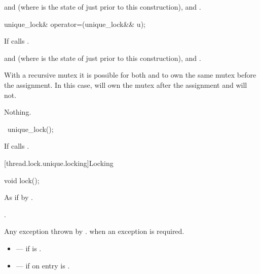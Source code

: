 \begin{itemdescr}
\pnum
\ensures
{} and  (where  is the state of  just prior to this construction),   and .
\end{itemdescr}

%
\begin{itemdecl}
unique_lock& operator=(unique_lock&& u);
\end{itemdecl}

\begin{itemdescr}
\pnum
\effects
If  calls .

\pnum
\ensures
{} and  (where  is the state of  just prior to this construction),   and .

\pnum
\begin{note}
With a recursive mutex it is possible for both  and  to own the same mutex before the assignment. In this case,  will own the mutex after the assignment and  will not.
\end{note}

\pnum
\throws
Nothing.
\end{itemdescr}

%
\begin{itemdecl}
~unique_lock();
\end{itemdecl}

\begin{itemdescr}
\pnum
\effects
If  calls .
\end{itemdescr}

[thread.lock.unique.locking]{Locking}

%
\begin{itemdecl}
void lock();
\end{itemdecl}

\begin{itemdescr}
\pnum
\effects
As if by .

\pnum
\ensures
{}.

\pnum
\throws
Any exception thrown by .  when an exception
is required.

\pnum
\errors
\begin{itemize}
\item {} --- if  is .
\item {} --- if on entry 
is .
\end{itemize}
\end{itemdescr}

